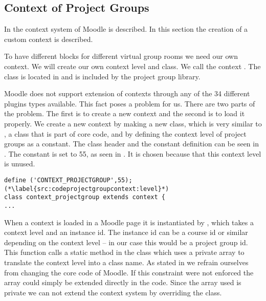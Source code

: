 \subsection{Context of Project Groups}
In   the context system of Moodle is described.
In this section the creation of a custom context is described. 

To have different blocks for different virtual group rooms we need our own context.
We will create our own context level and class.
We call the context . 
The class is located in  and is included by the project group library. 

Moodle does not support extension of contexts through any of the 34 different plugins types available. 
This fact poses a problem for us.
There are two parts of the problem.
The first is to create a new context and the second is to load it properly. 
We create a new context by making a new class, which is very similar to , a class that is part of \moodle{} core code, and by defining the context level of project groups as a constant. 
The class header and the constant definition can be seen in . 
The constant is set to 55, as seen in .
It is chosen because that this context level is unused.

\begin{lstlisting}[style=phpCode, caption=\myCaption{The context\_projectgroup class header and constant definition}, label=src:codeprojectgroupcontext]
define ('CONTEXT_PROJECTGROUP',55); (*\label{src:codeprojectgroupcontext:level}*)
class context_projectgroup extends context {
...
\end{lstlisting}

When a context is loaded in a Moodle page it is instantiated by , which takes a context level and an instance id. 
The instance id can be a course id or similar depending on the context level -- in our case this would be a project group id. 
This function calls a static method in the  class which uses a private array to translate the context level into a class name.
As stated in  we refrain ourselves from changing the core code of Moodle. 
If this constraint were not enforced the array could simply be extended directly in the code.  
Since the array used is private we can not extend the context system by overriding the  class. 

